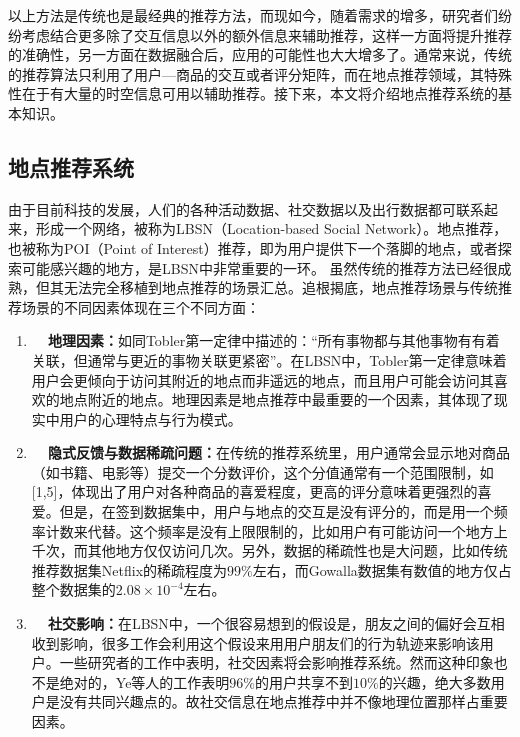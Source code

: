 以上方法是传统也是最经典的推荐方法，而现如今，随着需求的增多，研究者们纷纷考虑结合更多除了交互信息以外的额外信息来辅助推荐，这样一方面将提升推荐的准确性，另一方面在数据融合后，应用的可能性也大大增多了。通常来说，传统的推荐算法只利用了用户—商品的交互或者评分矩阵，而在地点推荐领域，其特殊性在于有大量的时空信息可用以辅助推荐。接下来，本文将介绍地点推荐系统的基本知识。


\subsection{地点推荐系统}
由于目前科技的发展，人们的各种活动数据、社交数据以及出行数据都可联系起来，形成一个网络，被称为LBSN（Location-based Social Network）。地点推荐，也被称为POI（Point of Interest）推荐，即为用户提供下一个落脚的地点，或者探索可能感兴趣的地方，是LBSN中非常重要的一环。
虽然传统的推荐方法已经很成熟，但其无法完全移植到地点推荐的场景汇总。追根揭底，地点推荐场景与传统推荐场景的不同因素体现在三个不同方面：

\begin{enumerate}
    \item \textbf{~~地理因素：}如同Tobler第一定律中描述的：“所有事物都与其他事物有有着关联，但通常与更近的事物关联更紧密”。在LBSN中，Tobler第一定律意味着用户会更倾向于访问其附近的地点而非遥远的地点，而且用户可能会访问其喜欢的地点附近的地点。地理因素是地点推荐中最重要的一个因素，其体现了现实中用户的心理特点与行为模式。

    \item \textbf{~~隐式反馈与数据稀疏问题：}在传统的推荐系统里，用户通常会显示地对商品（如书籍、电影等）提交一个分数评价，这个分值通常有一个范围限制，如[1,5]，体现出了用户对各种商品的喜爱程度，更高的评分意味着更强烈的喜爱。但是，在签到数据集中，用户与地点的交互是没有评分的，而是用一个频率计数来代替。这个频率是没有上限限制的，比如用户有可能访问一个地方上千次，而其他地方仅仅访问几次。另外，数据的稀疏性也是大问题，比如传统推荐数据集Netflix的稀疏程度为$99\%$左右，而Gowalla数据集有数值的地方仅占整个数据集的$2.08 \times 10 ^ { - 4 }$左右。

    \item \textbf{~~社交影响：}在LBSN中，一个很容易想到的假设是，朋友之间的偏好会互相收到影响，很多工作会利用这个假设来用用户朋友们的行为轨迹来影响该用户。一些研究者的工作中表明，社交因素将会影响推荐系统。然而这种印象也不是绝对的，Ye等人的工作表明$96\%$的用户共享不到$10\%$的兴趣，绝大多数用户是没有共同兴趣点的。故社交信息在地点推荐中并不像地理位置那样占重要因素。
\end{enumerate}

